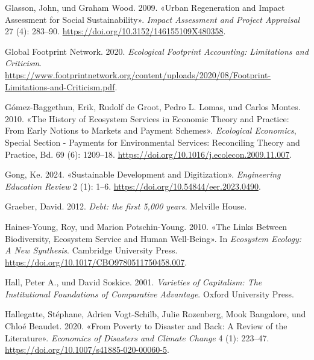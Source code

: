 \documentclass[
  nswissgerman,
  a4paper,
  openany]{book}
\newlength{\cslhangindent}
\newenvironment{CSLReferences}[2] %
 {\begin{list}{}{%
  \setlength{\itemindent}{0pt}
  \setlength{\leftmargin}{0pt}
  \setlength{\parsep}{0pt}
  \ifodd #1
   \setlength{\leftmargin}{\cslhangindent}
   \setlength{\itemindent}{-1\cslhangindent}
  \fi
  \setlength{\itemsep}{#2\baselineskip}}}
 {\end{list}}
\begin{document}
\begin{CSLReferences}{1}{1}
Glasson, John, und Graham Wood. 2009. {«Urban Regeneration and Impact
Assessment for Social Sustainability»}. \emph{Impact Assessment and
Project Appraisal} 27 (4): 283--90.
\url{https://doi.org/10.3152/146155109X480358}.

Global Footprint Network. 2020. \emph{Ecological {Footprint}
{Accounting}: {Limitations} and {Criticism}}.
\url{https://www.footprintnetwork.org/content/uploads/2020/08/Footprint-Limitations-and-Criticism.pdf}.

{Gómez-Baggethun, Erik, Rudolf de Groot, Pedro L. Lomas, und Carlos
Montes}. 2010. {«The History of Ecosystem Services in Economic Theory
and Practice: {From} Early Notions to Markets and Payment Schemes»}.
\emph{Ecological Economics}, Special {Section} - {Payments} for
{Environmental Services}: {Reconciling Theory} and {Practice}, Bd. 69
(6): 1209--18. \url{https://doi.org/10.1016/j.ecolecon.2009.11.007}.

Gong, Ke. 2024. {«Sustainable Development and Digitization»}.
\emph{Engineering Education Review} 2 (1): 1--6.
\url{https://doi.org/10.54844/eer.2023.0490}.

Graeber, David. 2012. \emph{Debt: the first 5,000 years}. Melville
House.

Haines-Young, Roy, und Marion Potschin-Young. 2010. {«The Links Between
Biodiversity, Ecosystem Service and Human Well-Being»}. In
\emph{Ecosystem {Ecology}: {A New Synthesis}}. Cambridge University
Press. \url{https://doi.org/10.1017/CBO9780511750458.007}.

Hall, Peter A., und David Soskice. 2001. \emph{Varieties of
{Capitalism}: {The Institutional Foundations} of {Comparative
Advantage}}. Oxford University Press.

Hallegatte, Stéphane, Adrien Vogt-Schilb, Julie Rozenberg, Mook
Bangalore, und Chloé Beaudet. 2020. {«From {Poverty} to {Disaster} and
{Back}: A {Review} of the {Literature}»}. \emph{Economics of Disasters
and Climate Change} 4 (1): 223--47.
\url{https://doi.org/10.1007/s41885-020-00060-5}.


\end{CSLReferences}
\end{document}
